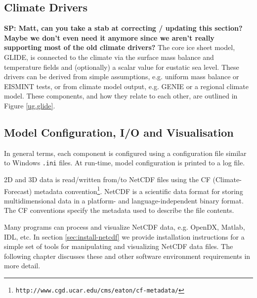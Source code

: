 \subsection{Climate Drivers}
\label{subsec:climdrive}
\textbf{SP: Matt, can you take a stab at correcting / updating this section? Maybe we don't even need it anymore since we aren't really supporting most of the old climate drivers?}
The core ice sheet model, GLIDE, is connected to the climate via the surface mass balance and temperature fields and (optionally) a scalar value for eustatic sea level. These drivers can be derived from simple assumptions, e.g. uniform mass balance or EISMINT tests, or from climate model output, e.g. GENIE or a regional climate model. These components, and how they relate to each other, are outlined in Figure \ref{ug.glide}.
%
%
\subsection{Model Configuration, I/O and Visualisation}
In general terms, each component is configured using a configuration file similar to Windows \texttt{.ini} files. At run-time, model configuration is printed to a log file. 

2D and 3D data is read/written from/to NetCDF files using the CF (Climate-Forecast) metadata convention\footnote{\texttt{http://www.cgd.ucar.edu/cms/eaton/cf-metadata/}}. NetCDF is a scientific data format for storing multidimensional data in a platform- and language-independent binary format. The CF conventions specify the metadata used to describe the file contents.

Many programs can process and visualize NetCDF data, e.g. OpenDX, Matlab, IDL, etc. In section \ref{sec:install-netcdf} we provide installation instructions for a simple set of tools for manipulating and visualizing NetCDF data files. The following chapter discusses these and other software environment requirements in more detail.  

